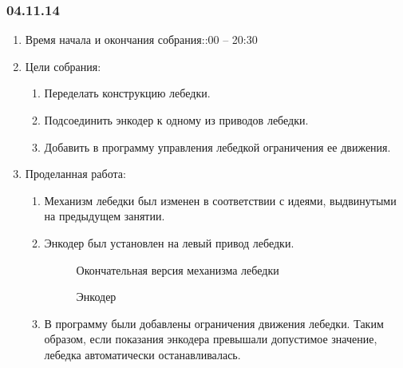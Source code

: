 
\subsubsection{04.11.14}

\begin{enumerate}
	\item Время начала и окончания собрания::00 – 20:30
	\item Цели собрания:\newline
	\begin{enumerate}
	  \item	Переделать конструкцию лебедки.\newline
	  
	  \item	Подсоединить энкодер к одному из приводов лебедки.\newline
	  
	  \item	Добавить в программу управления лебедкой ограничения ее движения.\newline
	  
    \end{enumerate}
    
	\item Проделанная работа:\newline
	\begin{enumerate}
	  \item	Механизм лебедки был изменен в соответствии с идеями, выдвинутыми на предыдущем занятии.\newline
      
      \item	Энкодер был установлен на левый привод лебедки.\newline
      
      \begin{figure}[H]
      	\begin{minipage}[h]{0.47\linewidth}
      		\caption{Окончательная версия механизма лебедки}
      	\end{minipage}
      	\hfill
      	\begin{minipage}[h]{0.47\linewidth}
      		\caption{Энкодер}
      	\end{minipage}
      \end{figure}
      
      \item	В программу были добавлены ограничения движения лебедки. Таким образом, если показания энкодера превышали допустимое значение, лебедка автоматически останавливалась.\newline
      

\end{enumerate}
\end{enumerate}
